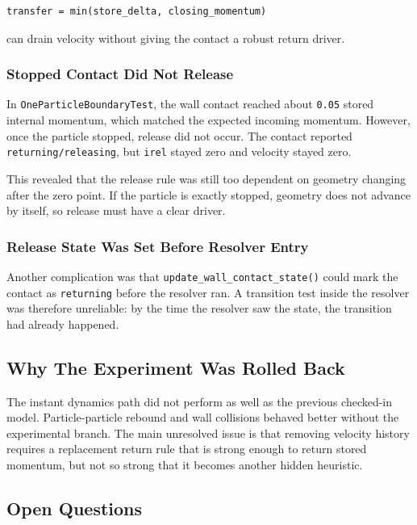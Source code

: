 \begin{verbatim}
transfer = min(store_delta, closing_momentum)
\end{verbatim}

can drain velocity without giving the contact a robust return driver.

\subsubsection{Stopped Contact Did Not Release}

In \texttt{OneParticleBoundaryTest}, the wall contact reached about
\texttt{0.05} stored internal momentum, which matched the expected incoming
momentum.  However, once the particle stopped, release did not occur.  The
contact reported \texttt{returning/releasing}, but \texttt{irel} stayed zero and
velocity stayed zero.

This revealed that the release rule was still too dependent on geometry changing
after the zero point.  If the particle is exactly stopped, geometry does not
advance by itself, so release must have a clear driver.

\subsubsection{Release State Was Set Before Resolver Entry}

Another complication was that \texttt{update\_wall\_contact\_state()} could mark
the contact as \texttt{returning} before the resolver ran.  A transition test
inside the resolver was therefore unreliable: by the time the resolver saw the
state, the transition had already happened.

\subsection{Why The Experiment Was Rolled Back}

The instant dynamics path did not perform as well as the previous checked-in
model.  Particle-particle rebound and wall collisions behaved better without the
experimental branch.  The main unresolved issue is that removing velocity
history requires a replacement return rule that is strong enough to return
stored momentum, but not so strong that it becomes another hidden heuristic.

\subsection{Open Questions}

